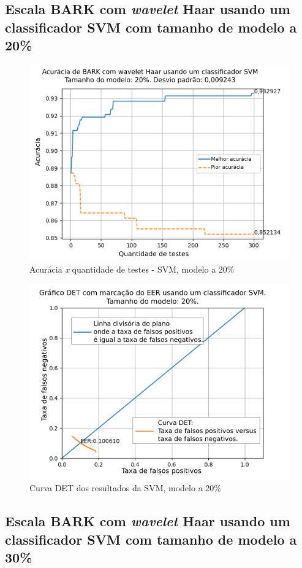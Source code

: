		\FloatBarrier
		\subsection{Escala BARK com \textit{wavelet} Haar usando um classificador SVM com tamanho de modelo a 20\%}

			
			
			\begin{figure}[h]
				\centering
				\includegraphics[width=.6\linewidth]{images/results/confusionMatrices/classifier_SVM_20.png}
				\caption{Acurácia \textit{x} quantidade de testes - SVM, modelo a 20\%}
				\label{fig:classifiersvm20}
			\end{figure}
		
			\begin{figure}[H]
				\centering
				\includegraphics[width=.6\linewidth]{images/results/det/DET_SVM_20}
				\caption{Curva DET dos resultados da SVM, modelo a 20\%}
				\label{fig:detsvm20}
			\end{figure}

			\FloatBarrier
		\subsection{Escala BARK com \textit{wavelet} Haar usando um classificador SVM com tamanho de modelo a 30\%}
			
			
